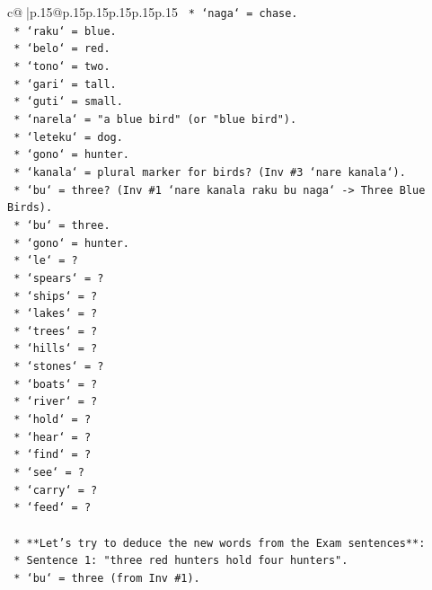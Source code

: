 \documentclass{article}
\begin{document}
{\begin{supertabular}{c@{$\;$}|p{.15\linewidth}@{}p{.15\linewidth}p{.15\linewidth}p{.15\linewidth}p{.15\linewidth}p{.15\linewidth}}
{{{\texttt{        *   `naga` = chase.} \\
\texttt{        *   `raku` = blue.} \\
\texttt{        *   `belo` = red.} \\
\texttt{        *   `tono` = two.} \\
\texttt{        *   `gari` = tall.} \\
\texttt{        *   `guti` = small.} \\
\texttt{        *   `narela` = "a blue bird" (or "blue bird").} \\
\texttt{        *   `leteku` = dog.} \\
\texttt{        *   `gono` = hunter.} \\
\texttt{        *   `kanala` = plural marker for birds? (Inv \#3 `nare kanala`).} \\
\texttt{        *   `bu` = three? (Inv \#1 `nare kanala raku bu naga` {-}> Three Blue Birds).} \\
\texttt{        *   `bu` = three.} \\
\texttt{        *   `gono` = hunter.} \\
\texttt{        *   `le` = ?} \\
\texttt{        *   `spears` = ?} \\
\texttt{        *   `ships` = ?} \\
\texttt{        *   `lakes` = ?} \\
\texttt{        *   `trees` = ?} \\
\texttt{        *   `hills` = ?} \\
\texttt{        *   `stones` = ?} \\
\texttt{        *   `boats` = ?} \\
\texttt{        *   `river` = ?} \\
\texttt{        *   `hold` = ?} \\
\texttt{        *   `hear` = ?} \\
\texttt{        *   `find` = ?} \\
\texttt{        *   `see` = ?} \\
\texttt{        *   `carry` = ?} \\
\texttt{        *   `feed` = ?} \\
\\ 
\texttt{    *   **Let's try to deduce the new words from the Exam sentences**:} \\
\texttt{        *   Sentence 1: "three red hunters hold four hunters".} \\
\texttt{            *   `bu` = three (from Inv \#1).} \\
}}}
\end{supertabular}}
\end{document}
